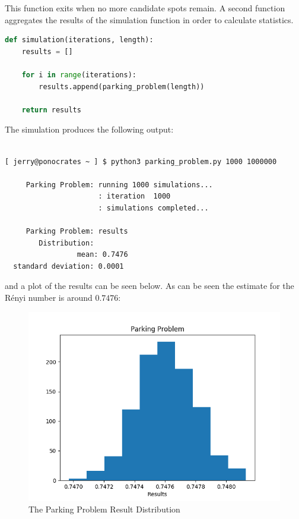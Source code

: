 \documentclass{report}
\begin{document}
This function exits when no more candidate spots remain. A second function aggregates the results of the 
simulation function in order to calculate statistics. \bigskip

\begin{lstlisting}[language=Python, caption=Simulation function]
def simulation(iterations, length):
	results = []
	
	for i in range(iterations):
		results.append(parking_problem(length))
	
	return results
\end{lstlisting}\medskip

The simulation produces the following output: \bigskip

\begin{lstlisting}[style=BashOutputStyle, caption=Simulation output]

[ jerry@ponocrates ~ ] $ python3 parking_problem.py 1000 1000000

     Parking Problem: running 1000 simulations...
                      : iteration  1000
                      : simulations completed...

     Parking Problem: results
        Distribution:
                 mean: 0.7476
  standard deviation: 0.0001

\end{lstlisting}\medskip

and a plot of the results can be seen below. As can be seen the estimate for the R\'{e}nyi number is around $0.7476$: \bigskip

\begin{figure}[h]
	\centering
	\includegraphics[scale = 0.75]{parking_problem_1000}
	\caption{The Parking Problem Result Distribution}
	\label{fig:tppd}
\end{figure}\medskip
\end{document}
